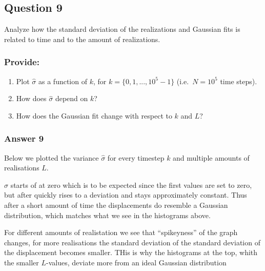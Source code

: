 \documentclass[11pt]{article}
\providecommand{\tightlist}{%
      \setlength{\itemsep}{0pt}\setlength{\parskip}{0pt}}
\begin{document}
    \hypertarget{question-9}{%
\subsection{Question 9}\label{question-9}}

Analyze how the standard deviation of the realizations and Gaussian fits
is related to time and to the amount of realizations.

\hypertarget{provide}{%
\subsubsection{Provide:}\label{provide}}

\begin{enumerate}
\def\labelenumi{\arabic{enumi}.}
\tightlist
\item
  Plot \(\hat{\sigma}\) as a function of \(k\), for
  \(k = \{0,1,...,10^5-1\}\) (i.e.~\(N = 10^5\) time steps).
\item
  How does \(\hat{\sigma}\) depend on \(k\)?
\item
  How does the Gaussian fit change with respect to \(k\) and \(L\)?
\end{enumerate}

    \hypertarget{answer-9}{%
\subsubsection{Answer 9}\label{answer-9}}

Below we plotted the variance \(\hat{\sigma}\) for every timestep \(k\)
and multiple amounts of realisations \(L\).

\(\hat{\sigma}\) starts of at zero which is to be expected since the
first values are set to zero, but after quickly rises to a deviation and
stays approximately constant. Thus after a short amount of time the
displacements do resemble a Gaussian distribution, which matches what we
see in the histograms above.

For different amounts of realistation we see that ``spikeyness'' of the
graph changes, for more realisations the standard deviation of the
standard deviation of the displacement becomes smaller. THis is why the
histograms at the top, whith the smaller \(L\)-values, deviate more from
an ideal Gaussian distribution
\end{document}
